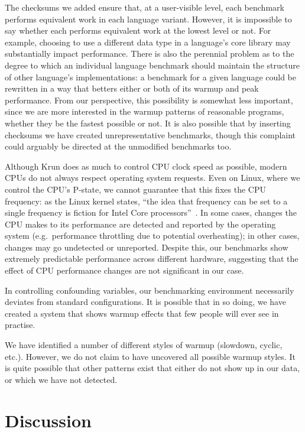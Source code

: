 \documentclass[a4paper,UKenglish]{lipics}
\newcommand{\krun}{Krun\xspace}
\begin{document}
The checksums we added ensure that, at a user-visible level, each benchmark
performs equivalent work in each language variant. However, it is impossible to
say whether each performs equivalent work at the lowest level or not. For
example, choosing to use a different data type in a language's core library may
substantially impact performance. There is also the perennial problem as to the
degree to which an individual language benchmark should maintain the structure
of other language's implementations: a benchmark for a given language could be
rewritten in a way that betters either or both of its warmup and peak
performance. From our perspective, this possibility is somewhat less important,
since we are more interested in the warmup patterns of reasonable programs,
whether they be the fastest possible or not. It is also possible that by
inserting checksums we have created unrepresentative benchmarks, though
this complaint could arguably be directed at the unmodified benchmarks too.

Although \krun does as much to control CPU clock speed as possible, modern CPUs
do not always respect operating system requests. Even on Linux, where we control
the CPU's P-state, we cannot guarantee that this fixes the CPU frequency: as
the Linux kernel states, ``the idea that frequency can be set to a single
frequency is fiction for Intel Core processors''~\cite{pstate}. In
some cases, changes the CPU makes to its performance are detected and reported
by the operating system (e.g.~performance throttling due to potential
overheating); in other cases, changes may go undetected or unreported.
Despite this, our benchmarks show extremely predictable performance across
different hardware, suggesting that the effect of CPU performance changes are
not significant in our case.

In controlling confounding variables, our benchmarking environment necessarily
deviates from standard configurations. It is possible that in so doing, we have
created a system that shows warmup effects that few people will ever see in
practise.

We have identified a number of different styles of warmup (slowdown, cyclic,
etc.). However, we do not claim to have uncovered all possible warmup styles. It
is quite possible that other patterns exist that either do not show up in our
data, or which we have not detected.


\section{Discussion}
\label{sec:Discussion}
\end{document}

